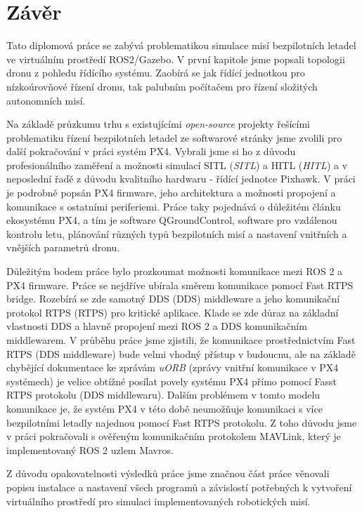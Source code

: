 \chapter*{Závěr}
{}

Tato diplomová práce se zabývá problematikou simulace misí bezpilotních letadel ve virtuálním prostředí ROS2/Gazebo. V první kapitole jsme popsali topologii dronu z pohledu řídícího systému. Zaobírá se jak řídící jednotkou pro nízkoúrovňové řízení dronu, tak palubním počítačem pro řízení složitých autonomních misí.

Na základě průzkumu trhu s existujícími \textit{open-source} projekty řešícími problematiku řízení bezpilotních letadel ze softwarové stránky jsme zvolili pro další pokračování v práci systém PX4. Vybrali jsme si ho z důvodu profesionálního zaměření a možnosti simulací SITL (\textit{\acl{SITL}}) a HITL (\textit{\acl{HITL}}) a v neposlední řadě z důvodu kvalitního hardwaru - řídící jednotce Pixhawk. V práci je podrobně popsán PX4 firmware, jeho architektura a možnosti propojení a komunikace s ostatními periferiemi. Práce taky pojednává o důležitém článku ekosystému PX4, a tím je software QGroundControl, software pro vzdálenou kontrolu letu, plánování různých typů bezpilotních misí a nastavení vnitřních a vnějších parametrů dronu.

Důležitým bodem práce bylo prozkoumat možnosti komunikace mezi ROS 2 a PX4 firmware. Práce se nejdříve ubírala směrem komunikace pomocí Fast RTPS bridge. Rozebírá se zde samotný \acs{DDS} (\acl{DDS}) middleware a jeho komunikační protokol \acs{RTPS} (\acl{RTPS}) pro kritické aplikace. Klade se zde důraz na základní vlastnosti \acs{DDS} a hlavně propojení mezi ROS 2 a \acs{DDS} komunikačním middlewarem. V průběhu práce jsme zjistili, že komunikace prostřednictvím Fast \acs{RTPS} (\acs{DDS} middleware) bude velmi vhodný přístup v budoucnu, ale na základě chybějící dokumentace ke zprávám \textit{uORB} (zprávy vnitřní komunikace v PX4 systémech) je velice obtížné posílat povely systému PX4 přímo pomocí Fasst RTPS protokolu (\acs{DDS} middlewaru). Dalším problémem v tomto modelu komunikace je, že systém PX4 v této době neumožňuje komunikaci s více bezpilotními letadly najednou pomocí Fast RTPS protokolu. Z toho důvodu jsme v práci pokračovali s ověřeným komunikačním protokolem MAVLink, který je implementovaný ROS 2 uzlem Mavros.

Z důvodu opakovatelnosti výsledků práce jsme značnou část práce věnovali popisu instalace a nastavení všech programů a závislostí potřebných k vytvoření virtuálního prostředí pro simulaci implementovaných robotických misí.

